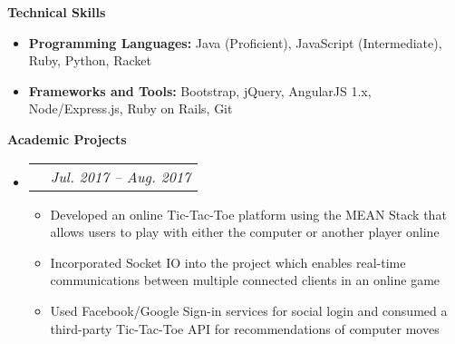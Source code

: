 \documentclass[letterpaper,11pt]{article}
\makeatletter
\newcommand{\resitem}[1]{\item #1 \vspace{-2pt}}
\newcommand{\resheading}[1]{{\large \colorbox{mygrey}{\begin{minipage}{\textwidth}{\textbf{#1 \vphantom{p\^{E}}}}\end{minipage}}}}
\newcommand{\ressubheadingproj}[4]{
\begin{tabular*}{6.5in}{l@{\extracolsep{\fill}}r}
    \textbf{#1} & \textit{#2} \\
\end{tabular*}\vspace{-6pt}}
\makeatother
\begin{document}

    \resheading{Technical Skills}
    \begin{itemize}
        \item {
        \textbf{Programming Languages:}
        \vspace{-0.2cm}
        Java (Proficient), JavaScript (Intermediate), Ruby, Python, Racket
        }

        \item {
        \textbf{Frameworks and Tools:}
        Bootstrap, jQuery, AngularJS 1.x, Node/Express.js, Ruby on Rails, Git
        }
    \end{itemize}


    \resheading{Academic Projects}

    \begin{itemize}
        \item\ressubheadingproj
        {\href
        {https://github.com/jeremylinlin/tic-tac-toe-mean}
        {Multiplayer Tic-Tac-Toe Platform \normalfont (Northeastern Univ.)}
        }
        {Jul. 2017 -- Aug. 2017}
        {}{}  %
        {\footnotesize
        \begin{itemize}
            \resitem
            {Developed an online Tic-Tac-Toe platform using the MEAN Stack that allows
            users to play with either the computer or another player online}
            \resitem{Incorporated Socket IO into the project which enables real-time
            communications between multiple connected clients in an online game}
            \resitem{Used Facebook/Google Sign-in services for social login and consumed a
            third-party Tic-Tac-Toe API for recommendations of computer moves}
        \end{itemize}
        }
    \end{itemize}
\end{document}
